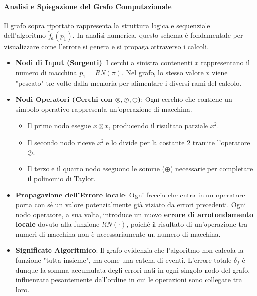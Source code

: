\documentclass[a4paper,12pt]{article}
\begin{document}
	\paragraph{Analisi e Spiegazione del Grafo Computazionale}
	
	Il grafo sopra riportato rappresenta la struttura logica e sequenziale dell'algoritmo $\tilde{f}_a(p_1)$. In analisi numerica, questo schema è fondamentale per visualizzare come l'errore si genera e si propaga attraverso i calcoli.
	
	\begin{itemize}
		\item \textbf{Nodi di Input (Sorgenti)}: I cerchi a sinistra contenenti $x$ rappresentano il numero di macchina $p_1 = RN(\pi)$. Nel grafo, lo stesso valore $x$ viene "pescato" tre volte dalla memoria per alimentare i diversi rami del calcolo.
		
		\item \textbf{Nodi Operatori (Cerchi con $\otimes, \oslash, \oplus$)}: Ogni cerchio che contiene un simbolo operativo rappresenta un'operazione di macchina. 
		\begin{itemize}
			\item Il primo nodo esegue $x \otimes x$, producendo il risultato parziale $x^2$. 
			\item Il secondo nodo riceve $x^2$ e lo divide per la costante $2$ tramite l'operatore $\oslash$.
			\item Il terzo e il quarto nodo eseguono le somme ($\oplus$) necessarie per completare il polinomio di Taylor.
		\end{itemize}
		
		\item \textbf{Propagazione dell'Errore locale}: Ogni freccia che entra in un operatore porta con sé un valore potenzialmente già viziato da errori precedenti. Ogni nodo operatore, a sua volta, introduce un nuovo \textbf{errore di arrotondamento locale} dovuto alla funzione $RN(\cdot)$, poiché il risultato di un'operazione tra numeri di macchina non è necessariamente un numero di macchina.
		
		\item \textbf{Significato Algoritmico}: Il grafo evidenzia che l'algoritmo non calcola la funzione "tutta insieme", ma come una catena di eventi. L'errore totale $\delta_f$ è dunque la somma accumulata degli errori nati in ogni singolo nodo del grafo, influenzata pesantemente dall'ordine in cui le operazioni sono collegate tra loro.
	\end{itemize}
	
\end{document}
